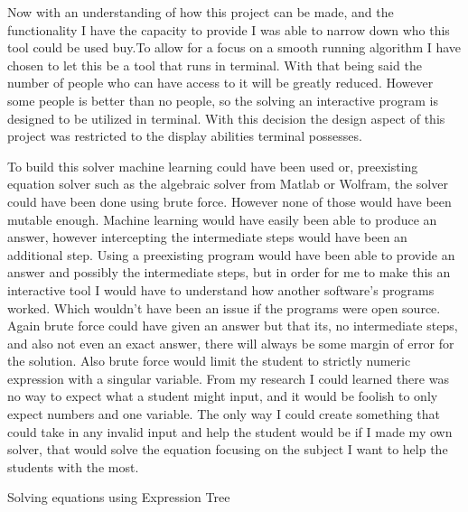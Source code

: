 \documentclass[10pt,twocolumn]{article}
\begin{document}
 Now with an understanding of how this project can be made, and the functionality I have the capacity to provide I was able to narrow down who this tool could be used buy.To allow for a focus on a smooth running algorithm I have chosen to let this be a tool that runs in terminal. With that being said the number of people who can have access to it will be greatly reduced. However some people is better than no people, so the solving an interactive program is designed to be utilized in terminal. With this decision the design aspect of this project was restricted to the display abilities terminal possesses.
 
To build this solver machine learning could have been used or, preexisting equation solver such as the algebraic solver from Matlab or Wolfram, the solver could have been done using brute force. However none of those would have been mutable enough. Machine learning would have easily been able to produce an answer, however intercepting the intermediate steps would have been an additional step. Using a preexisting program would have been able to provide an answer and possibly the intermediate steps, but in order for me to make this an interactive tool I would have to understand how another software's programs worked. Which wouldn't have been an issue if the programs were open source. Again brute force could have given an answer but that its, no intermediate steps, and also not even an exact answer, there will always be some margin of error for the solution. Also brute force would limit the student to strictly numeric expression with a singular variable. From my research I could learned there was no way to expect what a student might input, and it would be foolish to only expect numbers and one variable. The only way I could create something that could take in any invalid input and help the student would be if I made my own solver, that would solve the equation focusing on the subject I want to help the students with the most. 

\begin{algorithm}[H]
 \caption{Solving equations using Expression Tree}
\end{algorithm}
\end{document}
